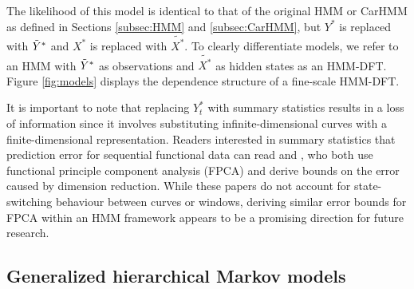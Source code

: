 The likelihood of this model is identical to that of the original HMM or CarHMM as defined in Sections \ref{subsec:HMM} and \ref{subsec:CarHMM}, but $Y^*$ is replaced with $\tilde{Y}^*$ and $X^*$ is replaced with $\tilde{X^*}$. To clearly differentiate models, we refer to an HMM with $\tilde{Y}^*$ as observations and $\tilde{X^*}$ as hidden states as an HMM-DFT. Figure \ref{fig:models} displays the dependence structure of a fine-scale HMM-DFT.

It is important to note that replacing $Y^*_t$ with summary statistics results in a loss of information since it involves substituting infinite-dimensional curves with a finite-dimensional representation. Readers interested in summary statistics that prediction error for sequential functional data can read \citet{Aue:2015} and \citet{Gao:2019}, who both use functional principle component analysis (FPCA) and derive bounds on the error caused by dimension reduction. While these papers do not account for state-switching behaviour between curves or windows, deriving similar error bounds for FPCA within an HMM framework appears to be a promising direction for future research. 

\subsection{Generalized hierarchical Markov models}

